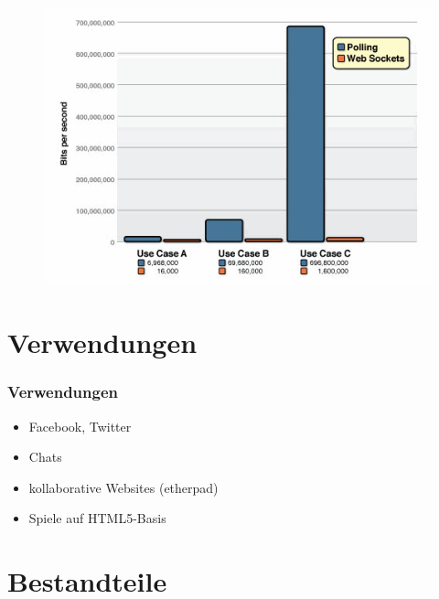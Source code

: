 \documentclass{beamer}
\begin{document}
\begin{frame}
\begin{figure}
\begin{center}
\includegraphics[width=12cm]{poll-ws-compare.png}
\end{center}
\end{figure}
\end{frame}

\section{Verwendungen}
\begin{frame}
\frametitle{Verwendungen}
\begin{itemize}
\item Facebook, Twitter
\item Chats
\item kollaborative Websites (etherpad)
\item Spiele auf HTML5-Basis
\end{itemize}
\end{frame}

\section{Bestandteile}
\end{document}
